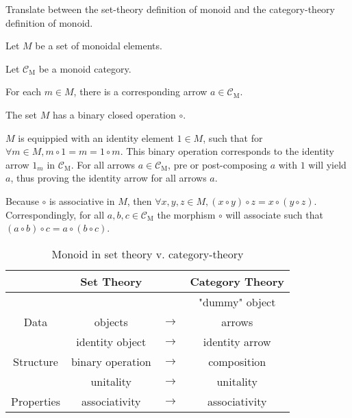 \begin{ttta}
Translate between the set-theory definition of monoid and the category-theory
definition of monoid.
\end{ttta}
\begin{proofitem}
    \item Let $M$ be a set of monoidal elements.
    \item Let $\mathcal{C}_\text{M}$ be a monoid category.
    \item For each $m\in M$, there is a corresponding arrow $a\in
        \mathcal{C}_\text{M}$.
    \item The set $M$ has a binary closed operation $\circ$.
    \item $M$ is equippied with an identity element $1\in M$, such that for
        $\forall m \in M, m\circ 1 = m = 1 \circ m$. This binary operation
        corresponds to the identity arrow $1_m$ in $\mathcal{C}_\text{M}$. For
        all arrows $a\in\mathcal{C}_\text{M}$, pre or post-composing $a$ with
        $1$ will yield $a$, thus proving the identity arrow for all arrows $a$.
    \item Because $\circ$ is associative in $M$, then $\forall x, y, z \in M,
        (x\circ y)\circ z = x\circ(y\circ z)$. Correspondingly, for all $a, b, c\in
        \mathcal{C}_\text{M}$ the morphism $\circ$ will associate such that
        $(a\circ b)\circ c= a\circ(b\circ c)$.
\end{proofitem}
\begin{table}
    \centering
    \begin{tabular}{ c|ccc }
    \hline
    & Set Theory & & Category Theory \\ \hline
    & & & "dummy" object \\
    Data & objects & $\rightarrow$ & arrows \\ \hline
    & identity object & $\rightarrow$ & identity arrow \\
    Structure & binary operation & $\rightarrow$ & composition \\ \hline
    & unitality & $\rightarrow$ & unitality \\
    Properties & associativity& $\rightarrow$ & associativity
    \\\hline
    \end{tabular}
    \caption{Monoid in set theory v. category-theory}
\end{table}


